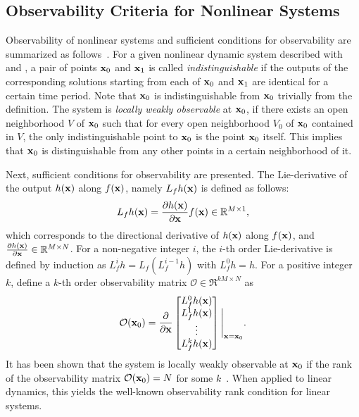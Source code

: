 \subsection{Observability Criteria for Nonlinear Systems}



Observability of nonlinear systems and sufficient conditions for observability are summarized as follows~\cite{HerKreITAC77,Nijvan90}. For a given nonlinear dynamic system described with  and , a pair of points $\mathbf{x}_0$ and $\mathbf{x}_1$ is called \textit{indistinguishable} if the outputs of the corresponding solutions starting from each of $\mathbf{x}_0$ and $\mathbf{x}_1$ are identical for a certain time period. Note that $\mathbf{x}_0$ is indistinguishable from $\mathbf{x}_0$ trivially from the definition. The system is \textit{locally weakly observable} at $\mathbf{x}_0$, if there exists an open neighborhood $V$ of $\mathbf{x}_0$ such that for every open neighborhood $V_0$ of $\mathbf{x}_0$ contained in $V$, the only indistinguishable point to $\mathbf{x}_0$ is the point $\mathbf{x}_0$ itself. This implies that $\mathbf{x}_0$ is distinguishable from any other points in a certain neighborhood of it.

Next, sufficient conditions for observability are presented. The Lie-derivative of the output $h(\mathbf{x})$ along $f(\mathbf{x})$, namely $L_f h(\mathbf{x})$ is defined as follows:
\begin{align*}
L_f h(\mathbf{x}) = \frac{\partial h(\mathbf{x})}{\partial \mathbf{x}}f(\mathbf{x})\in\mathbb{R}^{M\times 1},
\end{align*}
which corresponds to the directional derivative of $h(\mathbf{x})$ along $f(\mathbf{x})$, and $\frac{\partial h(\mathbf{x})}{\partial \mathbf{x}}\in\mathbb{R}^{M\times N}$. For a non-negative integer $i$, the $i$-th order Lie-derivative is defined by induction as $L_f^i h = L_f (L_f^{i-1} h)$ with $L_f^0 h = h$. For a positive integer $k$, define a $k$-th order observability matrix $\mathcal{O}\in\Re^{kM\times N}$ as
\begin{align*}
\mathcal{O}(\mathbf{x}_0) = \frac{\partial }{\partial \mathbf{x}} \begin{bmatrix} L_f^0 h(\mathbf{x}) \\ L_f^1 h(\mathbf{x})\\ \vdots \\L_f^{k} h(\mathbf{x})\end{bmatrix}\Bigg|_{\mathbf{x}=\mathbf{x}_0}.
\end{align*}
It has been shown that the system is locally weakly observable at $\mathbf{x}_0$ if the rank of the observability matrix $\mathcal{O}(\mathbf{x}_0) = N$ for some $k$~\cite{HerKreITAC77,Nijvan90}. When applied to linear dynamics, this yields the well-known observability rank condition for linear systems. 

